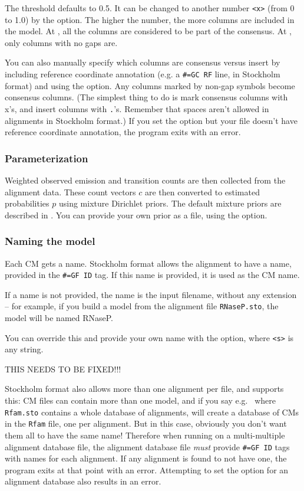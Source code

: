 The threshold defaults to 0.5. It can be changed to another number
\verb+<x>+ (from 0 to 1.0) by the  option.  The
higher the number, the more columns are included in the model.  At
, all the columns are considered to be part of
the consensus. At , only columns with no gaps are.

You can also manually specify which columns are consensus versus
insert by including reference coordinate annotation (e.g. a
\verb+#=GC RF+ line, in Stockholm format) and using the 
option. Any columns marked by non-gap symbols become consensus
columns. (The simplest thing to do is mark consensus columns with x's,
and insert columns with \verb+.+'s. Remember that spaces aren't
allowed in alignments in Stockholm format.) If you set the 
option but your file doesn't have reference coordinate annotation, the
program exits with an error.

\subsubsection{Parameterization}

Weighted observed emission and transition counts are then collected
from the alignment data. These count vectors $c$ are then converted to
estimated probabilities $p$ using mixture Dirichlet priors. The
default mixture priors are described in \cite{NawrockiEddy07}. You can
provide your own prior as a file, using the 
option.

\subsubsection{Naming the model}

Each CM gets a name. Stockholm format allows the alignment to have a
name, provided in the \verb+#=GF ID+ tag. If this name is provided,
it is used as the CM name.

If a name is not provided, the name is the input filename, without any
extension -- for example, if you build a model from the alignment file
\verb+RNaseP.sto+, the model will be named RNaseP.

You can override this and provide your own name with the 
option, where \verb+<s>+ is any string.

THIS NEEDS TO BE FIXED!!!

Stockholm format also allows more than one alignment per file, and
 supports this: CM files can contain more than one
model, and if you say e.g.\  where
\verb+Rfam.sto+ contains a whole database of alignments,
 will create a database of CMs in the \verb+Rfam+ file,
one per alignment. But in this case, obviously you don't want them all
to have the same name! Therefore when running  on a
multi-multiple alignment database file, the alignment database file
\emph{must} provide \verb+#=GF ID+ tags with names for each alignment.
If any alignment is found to not have one, the program exits at that
point with an error. Attempting to set the  option for an
alignment database also results in an error.


